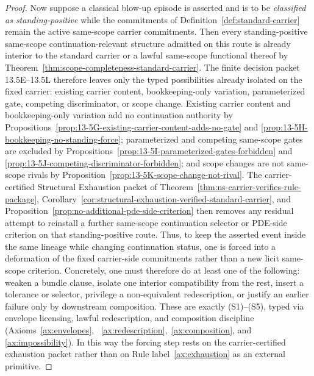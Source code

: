 \begin{proof}
Now suppose a classical blow-up episode is asserted and is to be \emph{classified as standing-positive}
while the commitments of Definition~\ref{def:standard-carrier} remain the active same-scope carrier
commitments.
Then every standing-positive same-scope continuation-relevant structure admitted on this route is already
interior to the standard carrier or a lawful same-scope functional thereof by
Theorem~\ref{thm:scope-completeness-standard-carrier}. The finite decision packet 13.5E--13.5L
therefore leaves only the typed possibilities already isolated on the fixed carrier: existing carrier
content, bookkeeping-only variation, parameterized gate, competing discriminator, or scope change.
Existing carrier content and bookkeeping-only variation add no continuation authority by
Propositions~\ref{prop:13-5G-existing-carrier-content-adds-no-gate} and
\ref{prop:13-5H-bookkeeping-no-standing-force}; parameterized and competing same-scope gates are
excluded by Propositions~\ref{prop:13-5I-parameterized-gates-forbidden} and
\ref{prop:13-5J-competing-discriminator-forbidden}; and scope changes are not same-scope rivals by
Proposition~\ref{prop:13-5K-scope-change-not-rival}. The carrier-certified Structural Exhaustion packet
of Theorem~\ref{thm:ns-carrier-verifies-rule-package},
Corollary~\ref{cor:structural-exhaustion-verified-standard-carrier}, and
Proposition~\ref{prop:no-additional-pde-side-criterion} then removes any residual attempt to reinstall
a further same-scope continuation selector or PDE-side criterion on that standing-positive route.
Thus, to keep the asserted event inside the same lineage while changing continuation status, one is
forced into a deformation of the fixed carrier-side commitments rather than a new licit same-scope
criterion. Concretely, one must therefore do at least one of the following: weaken a bundle clause,
isolate one interior compatibility from the rest, insert a tolerance or selector, privilege a
non-equivalent redescription, or justify an earlier failure only by downstream composition. These are
exactly (S1)--(S5), typed via envelope licensing, lawful redescription, and composition discipline
(Axioms~\ref{ax:envelopes}, ~\ref{ax:redescription},~\ref{ax:composition}, and
\ref{ax:impossibility}). In this way the forcing step rests on the carrier-certified exhaustion packet
rather than on Rule label~\ref{ax:exhaustion} as an external primitive.
\end{proof}

